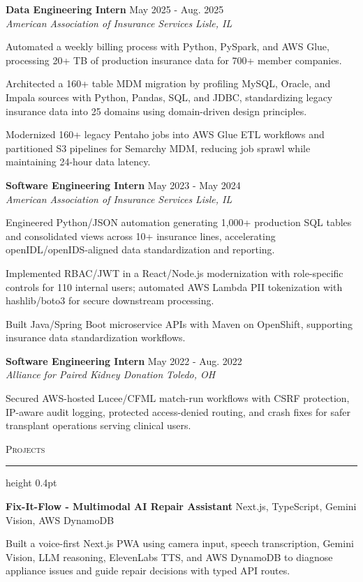 \documentclass[letterpaper,11pt]{article}
\newcommand{\resumesection}[1]{%
  \par\vspace{2pt}%
  {\large\scshape #1}\par\vspace{2pt}%
  \hrule height 0.4pt\vspace{2pt}%
}
\newcommand{\resumeSubheading}[4]{
  \textbf{#1} \hfill #2\\
  \textit{#3} \hfill \textit{#4}
}
\newcommand{\projectHeading}[2]{
  \textbf{#1} \hfill #2
}
\begin{document}
\resumeSubheading
{Data Engineering Intern}{May 2025 - Aug. 2025}
{American Association of Insurance Services}{Lisle, IL}
\begin{tightitemize}
  \item Automated a weekly billing process with Python, PySpark, and AWS Glue, processing 20+ TB of production insurance data for 700+ member companies.
  \item Architected a 160+ table MDM migration by profiling MySQL, Oracle, and Impala sources with Python, Pandas, SQL, and JDBC, standardizing legacy insurance data into 25 domains using domain-driven design principles.
  \item Modernized 160+ legacy Pentaho jobs into AWS Glue ETL workflows and partitioned S3 pipelines for Semarchy MDM, reducing job sprawl while maintaining 24-hour data latency.
\end{tightitemize}

\resumeSubheading
{Software Engineering Intern}{May 2023 - May 2024}
{American Association of Insurance Services}{Lisle, IL}
\begin{tightitemize}
  \item Engineered Python/JSON automation generating 1,000+ production SQL tables and consolidated views across 10+ insurance lines, accelerating openIDL/openIDS-aligned data standardization and reporting.
  \item Implemented RBAC/JWT in a React/Node.js modernization with role-specific controls for 110 internal users; automated AWS Lambda PII tokenization with hashlib/boto3 for secure downstream processing.
  \item Built Java/Spring Boot microservice APIs with Maven on OpenShift, supporting insurance data standardization workflows.
\end{tightitemize}

\resumeSubheading
{Software Engineering Intern}{May 2022 - Aug. 2022}
{Alliance for Paired Kidney Donation}{Toledo, OH}
\begin{tightitemize}
  \item Secured AWS-hosted Lucee/CFML match-run workflows with CSRF protection, IP-aware audit logging, protected access-denied routing, and crash fixes for safer transplant operations serving clinical users.
\end{tightitemize}

\resumesection{Projects}
\projectHeading{Fix-It-Flow - Multimodal AI Repair Assistant}{Next.js, TypeScript, Gemini Vision, AWS DynamoDB}
\begin{tightitemize}
  \item Built a voice-first Next.js PWA using camera input, speech transcription, Gemini Vision, LLM reasoning, ElevenLabs TTS, and AWS DynamoDB to diagnose appliance issues and guide repair decisions with typed API routes.
\end{tightitemize}
\end{document}
